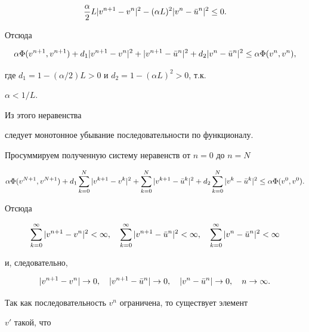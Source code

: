 \begin{pf}
\begin{multline*}
\frac{\alpha}{2}L|v^{n+1}-v^n|^2-(\alpha L)^2|v^n-\Bar u^n|^2\le 0.


\end{multline*}


Отсюда


\begin{equation}


\alpha\Phi(v^{n+1},v^{n+1})+d_1|v^{n+1}-v^n|^2+


|v^{n+1}-\Bar u^n|^2+d_2|v^n-\Bar u^n|^2


\le \alpha\Phi(v^n,v^n),


\end{equation}


где $d_1=1-(\alpha/2)L>0$ и $d_2=1-(\alpha L)^2>0$, т.к.


$\alpha<1/L$.


Из этого неравенства


следует монотонное убывание последовательности по функционалу.





Просуммируем полученную систему неравенств от $n=0$ до $n=N$


$$


\alpha\Phi(v^{N+1},v^{N+1})+d_1\sum^N_{k=0}|v^{k+1}-v^k|^2+


\sum^N_{k=0}|v^{k+1}-\Bar u^k|^2+d_2


\sum^N_{k=0}|v^k-\Bar u^k|^2\le \alpha\Phi(v^0,v^0).


$$


Отсюда


$$


\sum^\infty_{k=0}|v^{n+1}-v^n|^2<\infty,\quad


\sum^\infty_{k=0}|v^{n+1}-\Bar u^n|^2<\infty,\quad


\sum^\infty_{k=0}|v^n-\Bar u^n|^2<\infty


$$


и, следовательно,


\begin{equation}


|v^{n+1}-v^n|\to 0,\quad |v^{n+1}-\Bar u^n|\to 0,\quad


|v^n-\Bar u^n|\to 0,\quad n\to \infty.


\end{equation}





Так как последовательность $v^n$ ограничена, то существует элемент


$v'$ такой, что



\end{pf}
